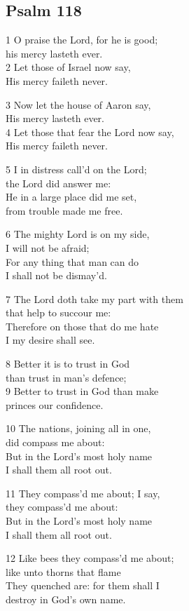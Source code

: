 \subsection*{Psalm 118}

1 O praise the Lord, for he is good;\\
his mercy lasteth ever.\\
2 Let those of Israel now say,\\
His mercy faileth never.

3 Now let the house of Aaron say,\\
His mercy lasteth ever.\\
4 Let those that fear the Lord now say,\\
His mercy faileth never.

5 I in distress call’d on the Lord;\\
the Lord did answer me:\\
He in a large place did me set,\\
from trouble made me free.

6 The mighty Lord is on my side,\\
I will not be afraid;\\
For any thing that man can do\\
I shall not be dismay’d.

7 The Lord doth take my part with them\\
that help to succour me:\\
Therefore on those that do me hate\\
I my desire shall see.

8 Better it is to trust in God\\
than trust in man’s defence;\\
9 Better to trust in God than make\\
princes our confidence.

10 The nations, joining all in one,\\
did compass me about:\\
But in the Lord’s most holy name\\
I shall them all root out.

11 They compass’d me about; I say,\\
they compass’d me about:\\
But in the Lord’s most holy name\\
I shall them all root out.

12 Like bees they compass’d me about;\\
like unto thorns that flame\\
They quenched are: for them shall I\\
destroy in God’s own name.

